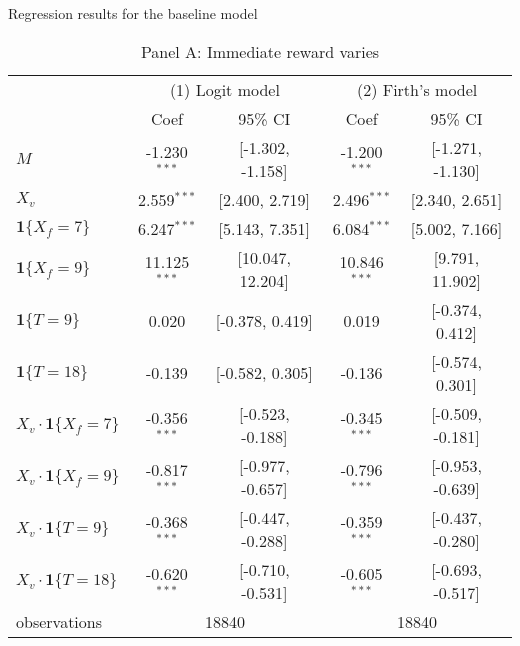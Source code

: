 \documentclass[12pt]{article}
\begin{document}
\begin{table}
    \captionsetup[sub]{singlelinecheck=false}
    \caption{Regression results for the baseline model}
    \begin{subtable}{\textwidth}
        \centering
        \captionsetup{justification=centering}
        \caption*{Panel A: Immediate reward varies}
\begin{tabular}{lcccc}
  \hline
   & \multicolumn{2}{c}{(1) Logit model} & \multicolumn{2}{c}{(2) Firth's model} \\ & Coef & 95\% CI & Coef & 95\% CI \\ \hline
$M$ & -1.230$^{***}$ & [-1.302, -1.158] & -1.200$^{***}$ & [-1.271, -1.130] \\ 
  $X_v$ & 2.559$^{***}$ & [2.400, 2.719] & 2.496$^{***}$ & [2.340, 2.651] \\ 
  $\textbf{1}\{X_f = 7\}$ & 6.247$^{***}$ & [5.143, 7.351] & 6.084$^{***}$ & [5.002, 7.166] \\ 
  $\textbf{1}\{X_f = 9\}$ & 11.125$^{***}$ & [10.047, 12.204] & 10.846$^{***}$ & [9.791, 11.902] \\ 
  $\textbf{1}\{T = 9\}$ & 0.020 & [-0.378, 0.419] & 0.019 & [-0.374, 0.412] \\ 
  $\textbf{1}\{T = 18\}$ & -0.139 & [-0.582, 0.305] & -0.136 & [-0.574, 0.301] \\ 
  $X_v\cdot\textbf{1}\{X_f = 7\}$ & -0.356$^{***}$ & [-0.523, -0.188] & -0.345$^{***}$ & [-0.509, -0.181] \\ 
  $X_v\cdot\textbf{1}\{X_f = 9\}$ & -0.817$^{***}$ & [-0.977, -0.657] & -0.796$^{***}$ & [-0.953, -0.639] \\ 
  $X_v\cdot\textbf{1}\{T = 9\}$ & -0.368$^{***}$ & [-0.447, -0.288] & -0.359$^{***}$ & [-0.437, -0.280] \\ 
  $X_v\cdot\textbf{1}\{T = 18\}$ & -0.620$^{***}$ & [-0.710, -0.531] & -0.605$^{***}$ & [-0.693, -0.517] \\ 
   \hline observations & \multicolumn{2}{c}{18840} & \multicolumn{2}{c}{18840} \\ \hline
\end{tabular}

    \end{subtable}
    
    \vspace*{12pt}


\end{table}
\end{document}
